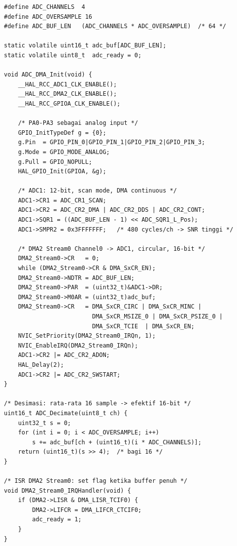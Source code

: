 \documentclass[12pt,a4paper]{article}
\begin{document}
\begin{lstlisting}[style=cstyle,
  caption={Inisialisasi ADC1 scan-mode + DMA2 circular 16x oversampling (FW4).}]
#define ADC_CHANNELS  4
#define ADC_OVERSAMPLE 16
#define ADC_BUF_LEN   (ADC_CHANNELS * ADC_OVERSAMPLE)  /* 64 */

static volatile uint16_t adc_buf[ADC_BUF_LEN];
static volatile uint8_t  adc_ready = 0;

void ADC_DMA_Init(void) {
    __HAL_RCC_ADC1_CLK_ENABLE();
    __HAL_RCC_DMA2_CLK_ENABLE();
    __HAL_RCC_GPIOA_CLK_ENABLE();

    /* PA0-PA3 sebagai analog input */
    GPIO_InitTypeDef g = {0};
    g.Pin  = GPIO_PIN_0|GPIO_PIN_1|GPIO_PIN_2|GPIO_PIN_3;
    g.Mode = GPIO_MODE_ANALOG;
    g.Pull = GPIO_NOPULL;
    HAL_GPIO_Init(GPIOA, &g);

    /* ADC1: 12-bit, scan mode, DMA continuous */
    ADC1->CR1 = ADC_CR1_SCAN;
    ADC1->CR2 = ADC_CR2_DMA | ADC_CR2_DDS | ADC_CR2_CONT;
    ADC1->SQR1 = ((ADC_BUF_LEN - 1) << ADC_SQR1_L_Pos);
    ADC1->SMPR2 = 0x3FFFFFFF;   /* 480 cycles/ch -> SNR tinggi */

    /* DMA2 Stream0 Channel0 -> ADC1, circular, 16-bit */
    DMA2_Stream0->CR   = 0;
    while (DMA2_Stream0->CR & DMA_SxCR_EN);
    DMA2_Stream0->NDTR = ADC_BUF_LEN;
    DMA2_Stream0->PAR  = (uint32_t)&ADC1->DR;
    DMA2_Stream0->M0AR = (uint32_t)adc_buf;
    DMA2_Stream0->CR   = DMA_SxCR_CIRC | DMA_SxCR_MINC |
                         DMA_SxCR_MSIZE_0 | DMA_SxCR_PSIZE_0 |
                         DMA_SxCR_TCIE  | DMA_SxCR_EN;
    NVIC_SetPriority(DMA2_Stream0_IRQn, 1);
    NVIC_EnableIRQ(DMA2_Stream0_IRQn);
    ADC1->CR2 |= ADC_CR2_ADON;
    HAL_Delay(2);
    ADC1->CR2 |= ADC_CR2_SWSTART;
}

/* Desimasi: rata-rata 16 sample -> efektif 16-bit */
uint16_t ADC_Decimate(uint8_t ch) {
    uint32_t s = 0;
    for (int i = 0; i < ADC_OVERSAMPLE; i++)
        s += adc_buf[ch + (uint16_t)(i * ADC_CHANNELS)];
    return (uint16_t)(s >> 4);  /* bagi 16 */
}

/* ISR DMA2 Stream0: set flag ketika buffer penuh */
void DMA2_Stream0_IRQHandler(void) {
    if (DMA2->LISR & DMA_LISR_TCIF0) {
        DMA2->LIFCR = DMA_LIFCR_CTCIF0;
        adc_ready = 1;
    }
}
\end{lstlisting}
\end{document}
